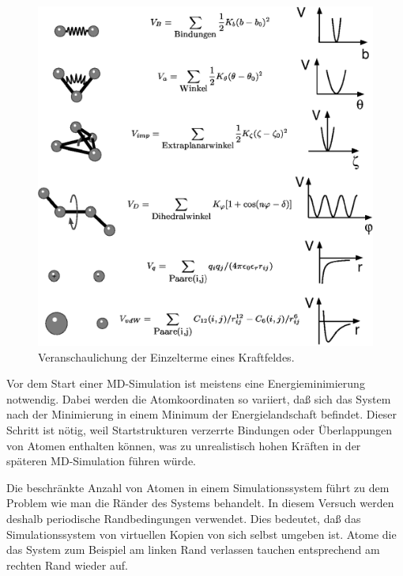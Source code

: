 \documentclass[a4paper,12pt]{article}
\begin{document}
\begin{figure}[htb]
    \centering
    \includegraphics{kraftfeld.png}
    \caption{Veranschaulichung der Einzelterme eines Kraftfeldes.}
    \label{fig:forcefield}
\end{figure}

Vor dem Start einer MD-Simulation ist meistens eine
Energieminimierung notwendig. Dabei werden die Atomkoordinaten
so variiert, da\ss{} sich das System nach der Minimierung in einem
Minimum der Energielandschaft befindet. Dieser Schritt ist n\"otig, weil
Startstrukturen verzerrte Bindungen oder \"Uberlappungen von Atomen enthalten
k\"onnen, was zu unrealistisch hohen Kr\"aften in der sp\"ateren MD-Simulation
f\"uhren w\"urde.

Die beschr\"ankte Anzahl von Atomen in einem Simulationssystem f\"uhrt
zu dem Problem wie man die R\"ander des Systems behandelt. In diesem
Versuch werden deshalb periodische Randbedingungen verwendet. Dies
bedeutet, da\ss{} das Simulationssystem von virtuellen Kopien von sich selbst
umgeben ist. Atome die das System zum Beispiel am linken Rand
verlassen tauchen entsprechend am rechten Rand wieder auf.

\pagebreak
\end{document}
